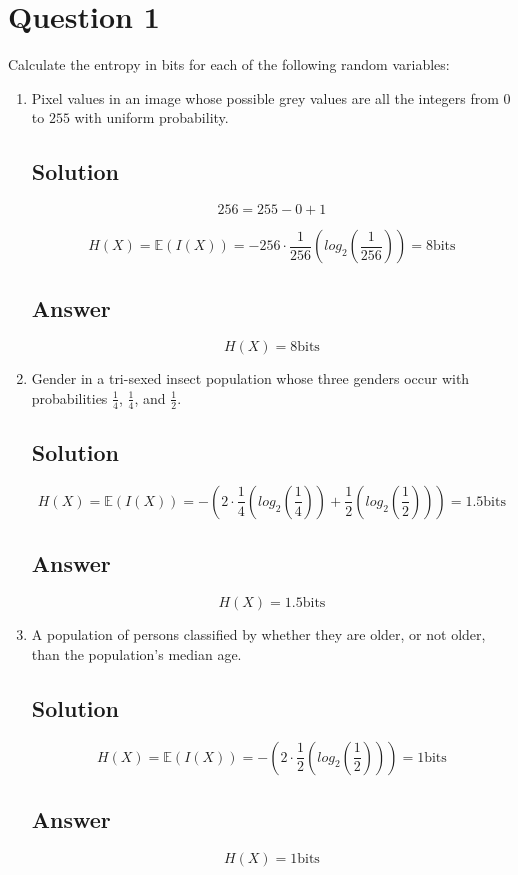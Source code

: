 \documentclass[12pt]{article}
\newcommand{\bE}{\mathbb{E}}
\begin{document}
	
	\section*{Question 1}
	
	\noindent Calculate the entropy in bits for each of the following random variables:
	
	\bigskip
	
	\begin{enumerate}[start=1,label={\bfseries Part \arabic*:},leftmargin=0in]
		\bigskip\item Pixel values in an image whose possible grey values are all the integers from $0$ to $255$ with uniform probability.
		
		\subsection*{Solution}
		
			\[256 = 255 - 0 + 1\]
		
			\[H(X) = \bE(I(X)) = -256 \cdot \frac{1}{256}\left(log_2\left(\frac{1}{256}\right)\right) = 8 \text{bits}\]
		
		\subsection*{Answer}
		
		\[\boxed{
			H(X) = 8 \text{bits}
		}\]
		
		\bigskip\item Gender in a tri-sexed insect population whose three genders occur with probabilities $\frac{1}{4}$, $\frac{1}{4}$, and $\frac{1}{2}$.
		
		\subsection*{Solution}
		
			\[H(X) = \bE(I(X)) = - \left(
				2 \cdot \frac{1}{4}\left(log_2\left(\frac{1}{4}\right)\right)
				+ \frac{1}{2}\left(log_2\left(\frac{1}{2}\right)\right)
			\right) = 1.5 \text{bits}\]
		
		\subsection*{Answer}
		
		\[\boxed{
			H(X) = 1.5 \text{bits}
		}\]
		
		\bigskip\item A population of persons classified by whether they are older, or not older, than the population's median age.
		
		\subsection*{Solution}
		
			\[H(X) = \bE(I(X)) = - \left(
			2 \cdot \frac{1}{2}\left(log_2\left(\frac{1}{2}\right)\right)\right) = 1 \text{bits}\]
		
		\subsection*{Answer}
		
		\[\boxed{H(X) = 1 \text{bits}}\]
	\end{enumerate}
	
\end{document}
